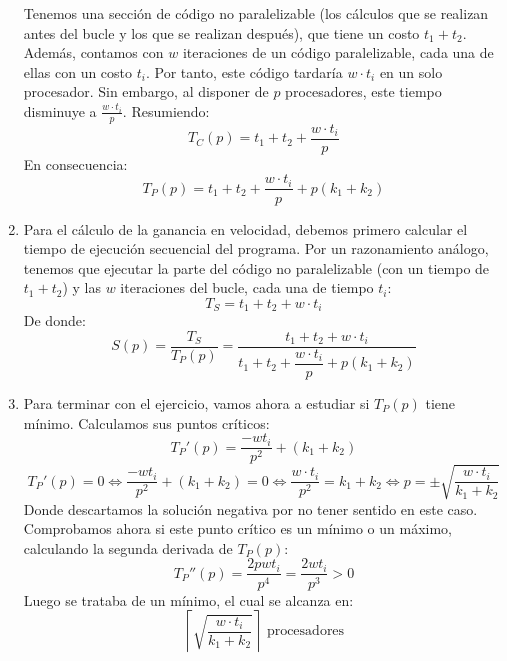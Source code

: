 \begin{ejercicio}
\begin{enumerate}
            Tenemos una sección de código no paralelizable (los cálculos que se realizan antes del bucle y los que se realizan después), que tiene un costo $t_1+t_2$. Además, contamos con $w$ iteraciones de un código paralelizable, cada una de ellas con un costo $t_i$. Por tanto, este código tardaría $w\cdot t_i$ en un solo procesador. Sin embargo, al disponer de $p$ procesadores, este tiempo disminuye a $\frac{w\cdot t_i}{p}$. Resumiendo:
            \begin{equation*}
                T_C(p) = t_1 + t_2 + \dfrac{w\cdot t_i}{p}
            \end{equation*}
            En consecuencia:
            \begin{equation*}
                T_P(p) = t_1 + t_2 + \dfrac{w\cdot t_i}{p} + p(k_1+k_2)
            \end{equation*}
        \item Para el cálculo de la ganancia en velocidad, debemos primero calcular el tiempo de ejecución secuencial del programa. Por un razonamiento análogo, tenemos que ejecutar la parte del código no paralelizable (con un tiempo de $t_1 + t_2$) y las $w$ iteraciones del bucle, cada una de tiempo $t_i$:
            \begin{equation*}
                T_S = t_1 + t_2 + w\cdot t_i
            \end{equation*}
            De donde:
            \begin{equation*}
                S(p) = \dfrac{T_S}{T_P(p)} = \dfrac{t_1 + t_2 + w\cdot t_i}{t_1 + t_2 + \dfrac{w\cdot t_i}{p} + p(k_1 + k_2)}
            \end{equation*}

        \item Para terminar con el ejercicio, vamos ahora a estudiar si $T_P(p)$ tiene mínimo. Calculamos sus puntos críticos:
            \begin{equation*}
                T_P'(p) = \dfrac{-wt_i}{p^2} + (k_1+k_2)
            \end{equation*}
            \begin{equation*}
                T_P'(p) = 0 \Longleftrightarrow \dfrac{-wt_i}{p^2} + (k_1+k_2) = 0 \Longleftrightarrow \dfrac{w\cdot t_i}{p^2}=k_1 + k_2 \Longleftrightarrow p = \pm \sqrt{\dfrac{w\cdot t_i}{k_1+k_2}}
            \end{equation*}
            Donde descartamos la solución negativa por no tener sentido en este caso. Comprobamos ahora si este punto crítico es un mínimo o un máximo, calculando la segunda derivada de $T_P(p)$:
            \begin{equation*}
                T_P''(p)= \dfrac{2pwt_i}{p^4} = \dfrac{2wt_i}{p^3} > 0
            \end{equation*}
            Luego se trataba de un mínimo, el cual se alcanza en:
            \begin{equation*}
                \left\lceil \sqrt{\dfrac{w\cdot t_i}{k_1+k_2}} \right\rceil \text{\ procesadores}
            \end{equation*}

    \end{enumerate}
\end{ejercicio}


